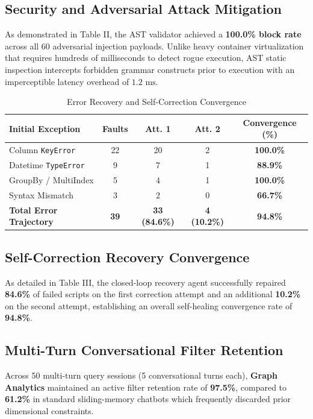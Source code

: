 \documentclass[conference]{IEEEtran}
\begin{document}
\subsection{Security and Adversarial Attack Mitigation}
As demonstrated in Table II, the AST validator achieved a \textbf{100.0\% block rate} across all 60 adversarial injection payloads. Unlike heavy container virtualization that requires hundreds of milliseconds to detect rogue execution, AST static inspection intercepts forbidden grammar constructs prior to execution with an imperceptible latency overhead of $1.2\text{ ms}$.

\begin{table}[h]
\caption{Error Recovery and Self-Correction Convergence}
\centering
\begin{tabular}{lcccc}
\toprule
\textbf{Initial Exception} & \textbf{Faults} & \textbf{Att. 1} & \textbf{Att. 2} & \textbf{Convergence (\%)} \\
\midrule
Column \texttt{KeyError} & 22 & 20 & 2 & \textbf{100.0\%} \\
Datetime \texttt{TypeError} & 9 & 7 & 1 & \textbf{88.9\%} \\
GroupBy / MultiIndex & 5 & 4 & 1 & \textbf{100.0\%} \\
Syntax Mismatch & 3 & 2 & 0 & \textbf{66.7\%} \\
\midrule
\textbf{Total Error Trajectory} & \textbf{39} & \textbf{33 (84.6\%)} & \textbf{4 (10.2\%)} & \textbf{94.8\%} \\
\bottomrule
\end{tabular}
\end{table}

\subsection{Self-Correction Recovery Convergence}
As detailed in Table III, the closed-loop recovery agent successfully repaired \textbf{84.6\%} of failed scripts on the first correction attempt and an additional \textbf{10.2\%} on the second attempt, establishing an overall self-healing convergence rate of \textbf{94.8\%}.

\subsection{Multi-Turn Conversational Filter Retention}
Across 50 multi-turn query sessions (5 conversational turns each), \textbf{Graph Analytics} maintained an active filter retention rate of \textbf{97.5\%}, compared to \textbf{61.2\%} in standard sliding-memory chatbots which frequently discarded prior dimensional constraints.
\end{document}
